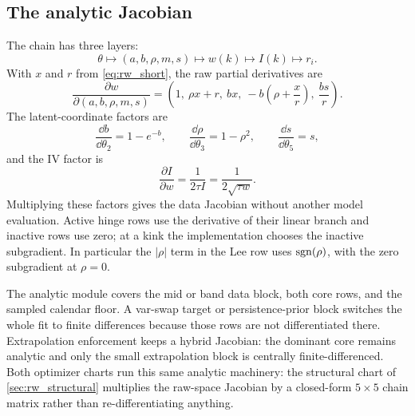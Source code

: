 \documentclass[11pt]{article}
\begin{document}
\subsection{The analytic Jacobian}
\label{sec:rw_jacobian}

The chain has three layers:
\[
\theta\longmapsto(a,b,\rho,m,s)
\longmapsto w(k)
\longmapsto I(k)
\longmapsto r_i.
\]
With $x$ and $r$ from \eqref{eq:rw_short}, the raw partial derivatives are
\begin{equation}
\frac{\partial w}{\partial(a,b,\rho,m,s)}=
\left(
1,\ \rho x+r,\ bx,\ -b\left(\rho+\frac{x}{r}\right),\
\frac{bs}{r}
\right).
\label{eq:rw_raw_partials}
\end{equation}
The latent-coordinate factors are
\begin{equation}
\frac{\dd b}{\dd\theta_2}=1-e^{-b},\qquad
\frac{\dd\rho}{\dd\theta_3}=1-\rho^2,
\qquad \frac{\dd s}{\dd\theta_5}=s,
\label{eq:rw_latent_factors}
\end{equation}
and the IV factor is
\begin{equation}
\frac{\partial I}{\partial w}
=\frac{1}{2\tau I}=\frac{1}{2\sqrt{\tau w}}.
\label{eq:rw_iv_factor}
\end{equation}
Multiplying these factors gives the data Jacobian without another model
evaluation.  Active hinge rows use the derivative of their linear branch and
inactive rows use zero; at a kink the implementation chooses the inactive
subgradient.  In particular the $|\rho|$ term in the Lee row uses
$\operatorname{sgn}(\rho)$, with the zero subgradient at $\rho=0$.

The analytic module covers the mid or band data block, both core rows, and the
sampled calendar floor.  A var-swap target or persistence-prior block switches
the whole fit to finite differences because those rows are not differentiated
there.  Extrapolation enforcement keeps a hybrid Jacobian: the dominant core
remains analytic and only the small extrapolation block is centrally
finite-differenced.  Both optimizer charts run this same analytic machinery:
the structural chart of \cref{sec:rw_structural} multiplies the raw-space
Jacobian by a closed-form $5\times5$ chain matrix rather than
re-differentiating anything.
\end{document}
